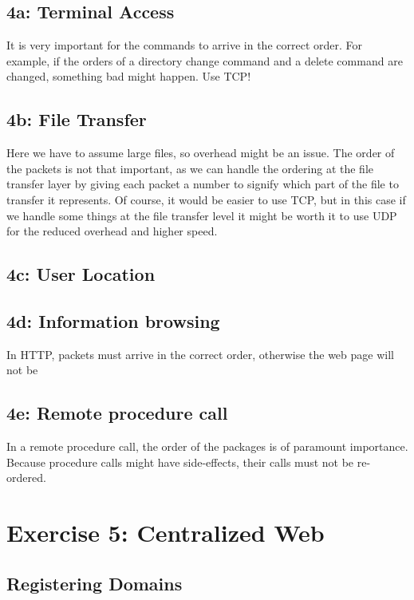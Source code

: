 \documentclass[a4paper]{article}
\begin{document}
\subsection{4a: Terminal Access}

It is very important for the commands to arrive in the correct order. For example, if the orders of a directory change command and a delete command are changed, something bad might happen. Use TCP!

\subsection{4b: File Transfer}

Here we have to assume large files, so overhead might be an issue. The order of the packets is not that important, as we can handle the ordering at the file transfer layer by giving each packet a number to signify which part of the file to transfer it represents. Of course, it would be easier to use TCP, but in this case if we handle some things at the file transfer level it might be worth it to use UDP for the reduced overhead and higher speed.

\subsection{4c: User Location}

\subsection{4d: Information browsing}

In HTTP, packets must arrive in the correct order, otherwise the web page will not be 

\subsection{4e: Remote procedure call}

In a remote procedure call, the order of the packages is of paramount importance. Because procedure calls might have side-effects, their calls must not be re-ordered.

\section{Exercise 5: Centralized Web}

\subsection{Registering Domains}
\end{document}
